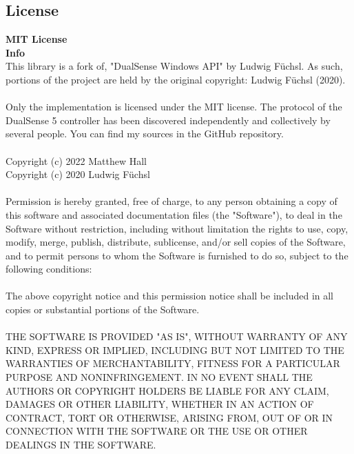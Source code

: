 \subsection{License}
\textbf{MIT License}\\

\textbf{Info}\\ 
This library is a fork of, "DualSense Windows API" by Ludwig F{\"u}chsl. As such, portions of the project are held by the original copyright: Ludwig F{\"u}chsl (2020).\\
\\
Only the implementation is licensed under the MIT license. The protocol of the DualSense 5 controller has been discovered independently and collectively by several people. You can find my sources in the GitHub repository.\\
\\
Copyright (c) 2022 Matthew Hall\\
Copyright (c) 2020 Ludwig F{\"u}chsl\\
\\
Permission is hereby granted, free of charge, to any person obtaining a copy of this software and associated documentation files (the "Software"), to deal in the Software without restriction, including without limitation the rights to use, copy, modify, merge, publish, distribute, sublicense, and/or sell copies of the Software, and to permit persons to whom the Software is furnished to do so, subject to the following conditions:\\
\\
The above copyright notice and this permission notice shall be included in all copies or substantial portions of the Software.\\
\\
THE SOFTWARE IS PROVIDED "AS IS", WITHOUT WARRANTY OF ANY KIND, EXPRESS OR IMPLIED, INCLUDING BUT NOT LIMITED TO THE WARRANTIES OF MERCHANTABILITY, FITNESS FOR A PARTICULAR PURPOSE AND NONINFRINGEMENT. IN NO EVENT SHALL THE AUTHORS OR COPYRIGHT HOLDERS BE LIABLE FOR ANY CLAIM, DAMAGES OR OTHER LIABILITY, WHETHER IN AN ACTION OF CONTRACT, TORT OR OTHERWISE, ARISING FROM, OUT OF OR IN CONNECTION WITH THE SOFTWARE OR THE USE OR OTHER DEALINGS IN THE SOFTWARE.

\newpage